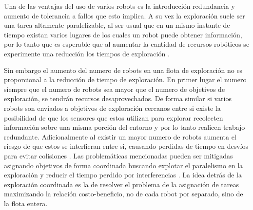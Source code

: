 Una de las ventajas del uso de varios robots es la introducción redundancia y aumento de tolerancia a fallos que esto implica. A su vez la exploración suele ser una tarea altamente paralelizable, al ser usual que en un mismo instante de tiempo existan varios lugares de los cuales un robot puede obtener información, por lo tanto que es esperable que al aumentar la cantidad de recursos robóticos se experimente una reducción los tiempos de exploración \cite{cao1997cooperative,dudek1996taxonomy,guzzoni1997many}. 

Sin embargo el aumento del numero de robots en una flota de exploración no es proporcional a la reducción de tiempo de exploración. En primer lugar el numero  siempre que el numero de robots sea mayor que el numero de objetivos de exploración, se tendrán recursos desaprovechados. De forma similar si varios robots son enviados a objetivos de exploración cercanos entre si existe la posibilidad de que los sensores que estos utilizan para explorar recolecten información sobre una misma porción del entorno y por lo tanto realicen trabajo redundante. Adicionalmente al existir un mayor numero de robots aumenta el riesgo de que estos se interfieran entre si, causando perdidas de tiempo en desvíos para evitar colisiones \cite{guzzoni1997many,goldberg1997interference}. %
Las problemáticas mencionadas pueden ser mitigadas asignando objetivos de forma coordinada buscando explotar el paralelismo en la exploración y reducir el tiempo perdido por interferencias \cite{nieto2014coordination}. La idea detrás de la exploración coordinada es la de resolver el problema de la asignación de tareas maximizando la relación costo-beneficio, no de cada robot por separado, sino de la flota entera.




